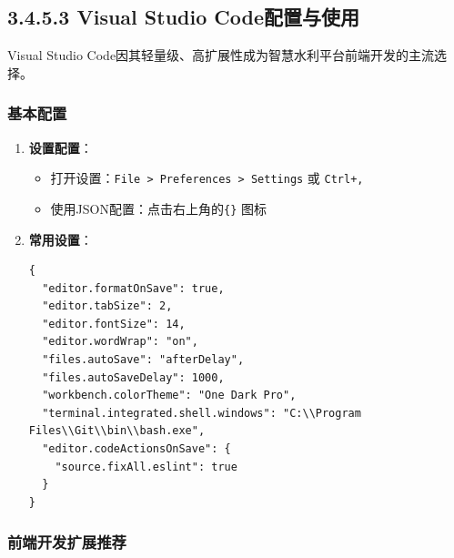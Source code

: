 \subsection{3.4.5.3 Visual Studio
Code配置与使用}\label{visual-studio-codeux914dux7f6eux4e0eux4f7fux7528}

Visual Studio
Code因其轻量级、高扩展性成为智慧水利平台前端开发的主流选择。

\subsubsection{基本配置}\label{ux57faux672cux914dux7f6e-1}

\begin{enumerate}
\def\labelenumi{\arabic{enumi}.}
\item
  \textbf{设置配置}：

  \begin{itemize}
  \tightlist
  \item
    打开设置：\passthrough{\lstinline!File > Preferences > Settings!} 或
    \passthrough{\lstinline!Ctrl+,!}
  \item
    使用JSON配置：点击右上角的\passthrough{\lstinline!\{\}!} 图标
  \end{itemize}
\item
  \textbf{常用设置}：

\begin{lstlisting}
{
  "editor.formatOnSave": true,
  "editor.tabSize": 2,
  "editor.fontSize": 14,
  "editor.wordWrap": "on",
  "files.autoSave": "afterDelay",
  "files.autoSaveDelay": 1000,
  "workbench.colorTheme": "One Dark Pro",
  "terminal.integrated.shell.windows": "C:\\Program Files\\Git\\bin\\bash.exe",
  "editor.codeActionsOnSave": {
    "source.fixAll.eslint": true
  }
}
\end{lstlisting}
\end{enumerate}

\subsubsection{前端开发扩展推荐}\label{ux524dux7aefux5f00ux53d1ux6269ux5c55ux63a8ux8350}


